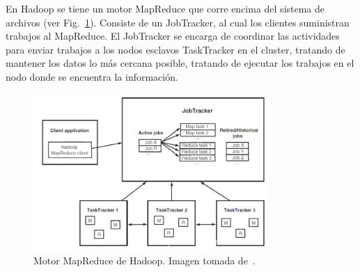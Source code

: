 \documentclass[conference]{IEEEtran}
\begin{document}












En Hadoop se tiene un motor MapReduce que corre encima del sistema de archivos (ver Fig.~\ref{motor}).
Consiste de un JobTracker, al cual los clientes suministran trabajos al MapReduce.
El JobTracker se encarga de coordinar las actividades para enviar trabajos a los nodos esclavos TaskTracker en el cluster, tratando de mantener los datos lo más cercana posible, tratando de ejecutar los trabajos en el nodo donde se encuentra la información.


\begin{figure}[htbp!]
\centering
\includegraphics[width=0.8\textwidth]{images/motor.png}
\caption{Motor MapReduce de Hadoop. Imagen tomada de~\cite{Holmes12}.}
\label{motor}
\end{figure}
\end{document}
